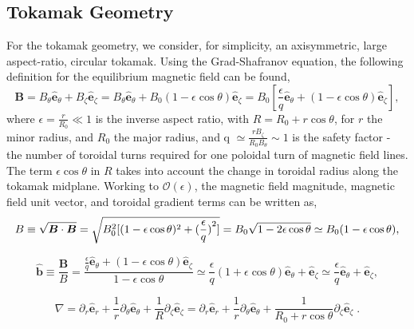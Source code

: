 \documentclass[12pt]{article}
\numberwithin{equation}{subsection}
\begin{document}
\subsection{Tokamak Geometry}
   \quad For the tokamak geometry, we consider, for simplicity, an axisymmetric, large aspect-ratio, circular tokamak.
Using the Grad-Shafranov equation, the following definition for the equilibrium magnetic field can be found,
   \begin{equation}
      \bm{B} = B_\theta\bm{\hat{e}}_\theta + B_\zeta\bm{\hat{e}}_\zeta =
               B_\theta\bm{\hat{e}}_\theta + B_0(1-\epsilon\cos\theta)\bm{\hat{e}}_\zeta =
               B_0[\frac{\epsilon}{q}\bm{\hat{e}}_\theta + (1-\epsilon\cos\theta)\bm{\hat{e}}_\zeta],
   \end{equation}
where $\epsilon=\frac{r}{R_0} \ll 1$ is the inverse aspect ratio, with $R=R_0+r\cos\theta$, for $r$ the minor radius,
and $R_0$ the major radius, and q $\simeq\frac{rB_\zeta}{R_0B_\theta}\sim1$ is the safety factor - the number of
toroidal turns required for one poloidal turn of magnetic field lines. The term $\epsilon\cos\theta$ in $R$ takes into
account the change in toroidal radius along the tokamak midplane. Working to $\mathcal{O}(\epsilon)$, the magnetic field
magnitude, magnetic field unit vector, and toroidal gradient terms can be written as,
   \begin{equation}
      B \equiv \sqrt{\bm{B}\cdot\bm{B}} = \sqrt{B_0^2[(1-\epsilon\cos\theta)^2 + (\frac{\epsilon}{q})\strut^2]} =
          B_0\sqrt{1-2\epsilon\cos\theta} \simeq B_0(1-\epsilon\cos\theta),
   \end{equation}

   \begin{equation}
      \bm{\hat{b}} \equiv \frac{\bm{B}}{B} = \frac{\frac{\epsilon}{q}\bm{\hat{e}}_\theta + (1-\epsilon\cos\theta)\bm{\hat{e}}_\zeta}
                     {1-\epsilon\cos\theta} \simeq \frac{\epsilon}{q}(1+\epsilon\cos\theta)\bm{\hat{e}}_\theta + 
                     \bm{\hat{e}}_\zeta \simeq \frac{\epsilon}{q}\bm{\hat{e}}_\theta + \bm{\hat{e}}_\zeta,
   \end{equation}

   \begin{equation}
      \nabla = \partial_r\bm{\hat{e}}_r + \frac{1}{r}\partial_\theta\bm{\hat{e}}_\theta +
               \frac{1}{R}\partial_\zeta\bm{\hat{e}}_\zeta = \partial_r\bm{\hat{e}}_r   +
               \frac{1}{r}\partial_\theta\bm{\hat{e}}_\theta + \frac{1}{R_0 + r\cos\theta}\partial_\zeta\bm{\hat{e}}_\zeta\;.
   \end{equation}
\end{document}
